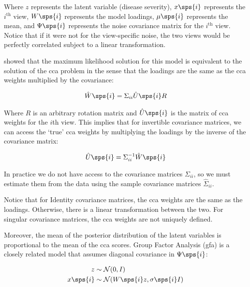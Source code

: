 Where \(z\) represents the latent variable (disease severity), \(x\sps{i}\) represents the $i^{\text{th}}$ view, \(W\sps{i}\) represents the model loadings, \(\mu\sps{i}\) represents the mean, and \(\Psi\sps{i}\) represents the noise covariance matrix for the $i^{\text{th}}$ view.
Notice that if it were not for the view-specific noise, the two views would be perfectly correlated subject to a linear transformation.

\citep{bach2005probabilistic} showed that the maximum likelihood solution for this model is equivalent to the solution of the \acrshort{cca} problem in the sense that the \gls{loadings} are the same as the \acrshort{cca} weights multiplied by the covariance:

\begin{align}\label{eq:probabilistic-cca}
    \hat{W}\sps{i} = \Sigma_{ii} \hat{U}\sps{i} R
\end{align}

Where $R$ is an arbitrary rotation matrix and $\hat{U}\sps{i}$ is the matrix of \acrshort{cca} weights for the $i$th view.
This implies that for invertible covariance matrices, we can access the `true' \acrshort{cca} weights by multiplying the \gls{loadings} by the inverse of the covariance matrix:

\begin{align}
    \hat{U}\sps{i} = \Sigma_{ii}^{-1} \hat{W}\sps{i}
\end{align}

In practice we do not have access to the covariance matrices $\Sigma_{ii}$, so we must estimate them from the data using the sample covariance matrices $\hat{\Sigma}_{ii}$.

Notice that for Identity covariance matrices, the \acrshort{cca} weights are the same as the loadings.
Otherwise, there is a linear transformation between the two.
For singular covariance matrices, the \acrshort{cca} weights are not uniquely defined.

Moreover, the mean of the posterior distribution of the latent variables is proportional to the mean of the \acrshort{cca} scores\citep{klami2013bayesian}.
Group Factor Analysis (\acrshort{gfa}) is a closely related model that assumes diagonal covariance in $\Psi\sps{i}$:

\begin{align}
    z& \sim \mathcal{N}(0, I)\\
    x\sps{i} & \sim \mathcal{N}(W\sps{i} z, \sigma\sps{i}I)
\end{align}

